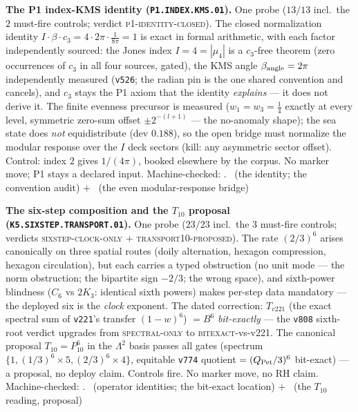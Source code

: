 \documentclass[11pt,a4paper]{article}
\newcommand{\cthree}{c_3}
\theoremstyle{definition}
\begin{document}
\par\smallskip\noindent\textbf{The P1 index-KMS identity
(\texttt{P1.INDEX.KMS.01}).}
One probe ($13/13$ incl.\ the $2$ must-fire controls; verdict
\textsc{p1-identity-closed}).  The closed normalization identity
$I\cdot\beta\cdot\cthree=4\cdot2\pi\cdot\tfrac1{8\pi}=1$ is exact
in formal arithmetic, with each factor independently sourced: the
Jones index $I=4=|\mu_4|$ is a $\cthree$-free theorem (zero
occurrences of $\cthree$ in all four sources, gated), the KMS angle
$\beta_{\rm angle}=2\pi$ independently measured (\texttt{v526}; the
radian pin is the one shared convention and cancels), and
$\cthree$ stays the P1 axiom that the identity \emph{explains} ---
it does not derive it.  The finite evenness precursor is measured
($w_1=w_3=\tfrac14$ exactly at every level, symmetric zero-sum
offset $\pm2^{-(l+1)}$ --- the no-anomaly shape); the sea state
does \emph{not} equidistribute (dev $0.188$), so the open bridge
must normalize the modular response over the $I$ deck sectors
(kill: any asymmetric sector offset).  Control: index $2$ gives
$1/(4\pi)$, booked elsewhere by the corpus.  No marker move; P1
stays a declared input.
Machine-checked: .
\mE\ (the identity; the convention audit) $+$ \mO\ (the even
modular-response bridge)
\par\smallskip

\par\smallskip\noindent\textbf{The six-step composition and the
$T_{10}$ proposal (\texttt{K5.SIXSTEP.TRANSPORT.01}).}
One probe ($23/23$ incl.\ the $3$ must-fire controls; verdicts
\textsc{sixstep-clock-only} $+$ \textsc{transport10-proposed}).
The rate $(2/3)^6$ arises canonically on three spatial routes
(doily alternation, hexagon compression, hexagon circulation), but
each carries a typed obstruction (no unit mode --- the norm
obstruction; the bipartite sign $-2/3$; the wrong space), and
sixth-power blindness ($C_6$ vs $2K_3$: identical sixth powers)
makes per-step data mandatory --- the deployed six is the
\emph{clock} exponent.  The dated correction: $T_{v221}$ (the
exact spectral sum of \texttt{v221}'s transfer $(1-w)^6$) $=B^6$
\emph{bit-exactly} --- the \texttt{v808} sixth-root verdict
upgrades from \textsc{spectral-only} to \textsc{bitexact}-vs-v221.
The canonical proposal $T_{10}=P_{10}^6$ in the $\Lambda^2$ basis
passes all gates (spectrum $\{1,(1/3)^6{\times}5,
(2/3)^6{\times}4\}$, equitable \texttt{v774} quotient
$=(Q_{\rm Pet}/3)^6$ bit-exact) --- a proposal, no deploy claim.
Controls fire.  No marker move, no RH claim.
Machine-checked: .
\mE\ (operator identities; the bit-exact location) $+$ \mC\
(the $T_{10}$ reading, proposal)
\par\smallskip
\end{document}
